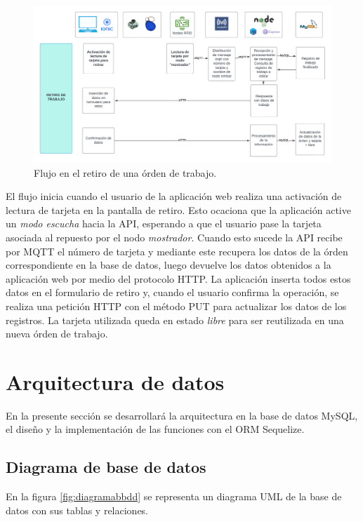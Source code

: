 \begin{figure}[ht]
	\centering
	\includegraphics[scale=.10]{./Figures/flujo-retiro.png}
	\caption{Flujo en el retiro de una órden de trabajo.}
	\label{fig:flujoretiro}
\end{figure}

El flujo inicia cuando el usuario de la aplicación web realiza una activación de lectura de tarjeta en la pantalla de retiro. Esto ocaciona que la aplicación active un \textit{modo escucha} hacia la API, esperando a que el usuario pase la tarjeta asociada al repuesto por el nodo \textit{mostrador}. Cuando esto sucede la API recibe por MQTT el número de tarjeta y mediante este recupera los datos de la órden correspondiente en la base de datos, luego devuelve los datos obtenidos a la aplicación web por medio del protocolo HTTP. La aplicación inserta todos estos datos en el formulario de retiro y, cuando el usuario confirma la operación, se realiza una petición HTTP con el método PUT para actualizar los datos de los registros. La tarjeta utilizada queda en estado \textit{libre} para ser reutilizada en una nueva órden de trabajo.

\section{Arquitectura de datos}
\label{sec:arquitecturadatos}
En la presente sección se desarrollará la arquitectura en la base de datos MySQL, el diseño y la implementación de las funciones con el ORM Sequelize.

\subsection{Diagrama de base de datos}
\label{subsec:diagramabasededatos}

En la figura \ref{fig:diagramabbdd} se representa un diagrama UML de la base de datos con sus tablas y relaciones.

